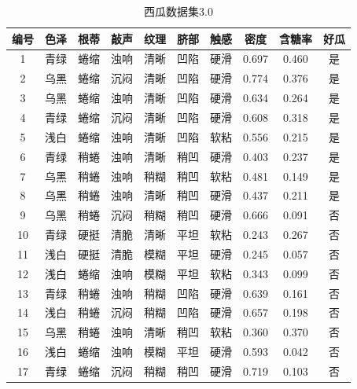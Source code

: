 \begin{table}[htbp]
  \centering
  \caption{西瓜数据集3.0}
  \label{tab:watermelon3.0}
  \begin{tabular}{|c|c|c|c|c|c|c|c|c|c|}
    \hline
    编号 & 色泽 & 根蒂 & 敲声 & 纹理 & 脐部 & 触感 & 密度 & 含糖率 & 好瓜 \\
    \hline
    1 & 青绿 & 蜷缩 & 浊响 & 清晰 & 凹陷 & 硬滑 & 0.697 & 0.460 & 是 \\
    \hline
    2 & 乌黑 & 蜷缩 & 沉闷 & 清晰 & 凹陷 & 硬滑 & 0.774 & 0.376 & 是 \\
    \hline
    3 & 乌黑 & 蜷缩 & 浊响 & 清晰 & 凹陷 & 硬滑 & 0.634 & 0.264 & 是 \\
    \hline
    4 & 青绿 & 蜷缩 & 沉闷 & 清晰 & 凹陷 & 硬滑 & 0.608 & 0.318 & 是 \\
    \hline
    5 & 浅白 & 蜷缩 & 浊响 & 清晰 & 凹陷 & 软粘 & 0.556 & 0.215 & 是 \\
    \hline
    6 & 青绿 & 稍蜷 & 浊响 & 清晰 & 稍凹 & 硬滑 & 0.403 & 0.237 & 是 \\
    \hline
    7 & 乌黑 & 稍蜷 & 浊响 & 稍糊 & 稍凹 & 软粘 & 0.481 & 0.149 & 是 \\
    \hline
    8 & 乌黑 & 稍蜷 & 浊响 & 清晰 & 稍凹 & 硬滑 & 0.437 & 0.211 & 是 \\
    \hline
    9 & 乌黑 & 稍蜷 & 沉闷 & 稍糊 & 稍凹 & 硬滑 & 0.666 & 0.091 & 否 \\
    \hline
    10 & 青绿 & 硬挺 & 清脆 & 清晰 & 平坦 & 软粘 & 0.243 & 0.267 & 否 \\
    \hline
    11 & 浅白 & 硬挺 & 清脆 & 模糊 & 平坦 & 硬滑 & 0.245 & 0.057 & 否 \\
    \hline
    12 & 浅白 & 蜷缩 & 浊响 & 模糊 & 平坦 & 软粘 & 0.343 & 0.099 & 否 \\
    \hline
    13 & 青绿 & 稍蜷 & 浊响 & 稍糊 & 凹陷 & 硬滑 & 0.639 & 0.161 & 否 \\
    \hline
    14 & 浅白 & 稍蜷 & 沉闷 & 稍糊 & 凹陷 & 硬滑 & 0.657 & 0.198 & 否 \\
    \hline
    15 & 乌黑 & 稍蜷 & 浊响 & 清晰 & 稍凹 & 软粘 & 0.360 & 0.370 & 否 \\
    \hline
    16 & 浅白 & 蜷缩 & 浊响 & 模糊 & 平坦 & 硬滑 & 0.593 & 0.042 & 否 \\
    \hline
    17 & 青绿 & 蜷缩 & 沉闷 & 稍糊 & 稍凹 & 硬滑 & 0.719 & 0.103 & 否 \\
    \hline
  \end{tabular}
\end{table}

